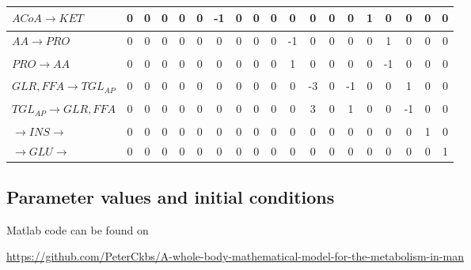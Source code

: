 \documentclass{IEEEtran}
\begin{document}
\begin{table}[H]
{\begin{tabular}{c|c|c|c|c|c|c|c|c|c|c|c|c|c|c|c|c|c|c|}
\multicolumn{1}{|l|}{$ACoA \xrightarrow[]{} KET$}     & 0   & 0   & 0   & 0    & 0   & -1   & 0   & 0   & 0   & 0  & 0   & 0   & 0   & 1   & 0 & 0  & 0 & 0 \\ \hline
\multicolumn{1}{|l|}{$AA \xrightarrow[]{} PRO$}       & 0   & 0   & 0   & 0    & 0   & 0    & 0   & 0   & 0   & -1 & 0   & 0   & 0   & 0   & 1 & 0  & 0 & 0 \\ \hline
\multicolumn{1}{|l|}{$PRO \xrightarrow[]{} AA$}       & 0   & 0   & 0   & 0    & 0   & 0    & 0   & 0   & 0   & 1  & 0   & 0   & 0   & 0   & -1 & 0 & 0 & 0 \\ \hline
\multicolumn{1}{|l|}{$GLR,FFA \xrightarrow[]{} TGL_{AP}$}  & 0   & 0   & 0   & 0    & 0   & 0    & 0   & 0   & 0   & 0  & -3  & 0   & -1  & 0   & 0 & 1  & 0 & 0 \\ \hline
\multicolumn{1}{|l|}{$TGL_{AP} \xrightarrow[]{} GLR,FFA$}  & 0   & 0   & 0   & 0    & 0   & 0    & 0   & 0   & 0   & 0  & 3   & 0  & 1   & 0   & 0  & -1  & 0 & 0 \\ \hline
\multicolumn{1}{|l|}{$\rightarrow INS \rightarrow$}  & 0   & 0   & 0   & 0    & 0   & 0    & 0   & 0   & 0   & 0  & 0  & 0   & 0  & 0   & 0 & 0  & 1 & 0 \\ \hline
\multicolumn{1}{|l|}{$\rightarrow GLU \rightarrow$}  & 0   & 0   & 0   & 0    & 0   & 0    & 0   & 0   & 0   & 0  & 0   & 0  & 0   & 0   & 0  & 0  & 0 & 1 \\ \hline
\end{tabular}%
}

\label{tab:stoichiometric_matrix}
\end{table}

\subsection{Parameter values and initial conditions}

Matlab code can be found on 

\url{https://github.com/PeterCkbs/A-whole-body-mathematical-model-for-the-metabolism-in-man}

\newpage

\twocolumn



\end{document}
